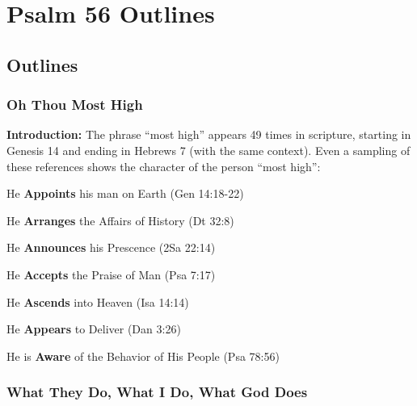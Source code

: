 \section{Psalm 56 Outlines}

\subsection{Outlines}

\subsubsection{Oh Thou Most High}
\textbf{Introduction: }The phrase ``most high'' appears 49 times in scripture, starting in Genesis 14 and ending in Hebrews 7 (with the same context).  Even a sampling of these references shows the character of the person ``most high'':
\begin{compactenum}[I.][8]
    \item He \textbf{Appoints} his man on Earth  (Gen 14:18-22)
    \item He \textbf{Arranges} the Affairs of History  (Dt 32:8)
    \item He \textbf{Announces} his Prescence  (2Sa 22:14)
    \item He \textbf{Accepts} the Praise of Man  (Psa 7:17)
    \item He \textbf{Ascends} into Heaven (Isa 14:14)
    \item He \textbf{Appears} to Deliver  (Dan 3:26)
    \item He is \textbf{Aware} of the Behavior of His People  (Psa 78:56)
\end{compactenum}

\subsubsection{What They Do, What I Do, What God Does}


